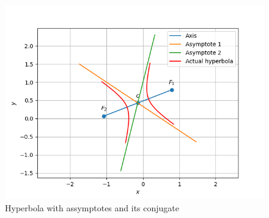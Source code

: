 \begin{enumerate}
\begin{figure}[!ht]
    \centering
    \includegraphics[width=\columnwidth]{./figs/asymp/hyper_asymp.png}
    \caption{Hyperbola with assymptotes and its conjugate}
    \label{eq:solutions/40/7/Fig :1}
\end{figure}
\end{enumerate}
